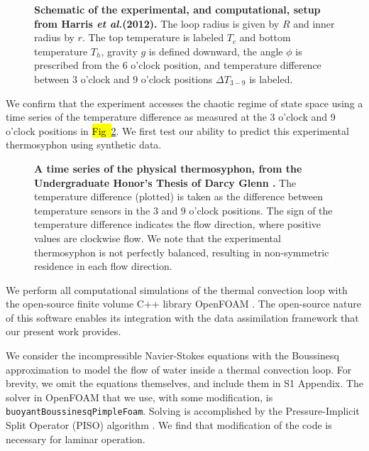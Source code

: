 \documentclass[10pt,letterpaper]{article}
\newcommand{\etal}{\textit{et al.}}
\begin{document}
\begin{figure}[h]
  \centering
  \caption[Schematic of the experimental, and computational, setup from Harris \etal (2012)]{
\textbf{    Schematic of the experimental, and computational, setup from Harris \etal (2012).
}    The loop radius is given by $R$ and inner radius by $r$.
    The top temperature is labeled $T_c$ and bottom temperature $T_h$, gravity $g$ is defined downward, the angle $\phi$ is prescribed from the 6 o'clock position, and temperature difference between 3 o'clock and 9 o'clock positions $\Delta T_{3-9}$ is labeled.
  }
  \label{fig:thermosyphon-schematic}
\end{figure}

We confirm that the experiment accesses the chaotic regime of state space using a time series of the temperature difference as measured at the 3 o'clock and 9 o'clock positions in \hl{Fig~}\ref{fig:thermosyphon-physical-timeseries}.
We first test our ability to predict this experimental thermosyphon using synthetic data.

\begin{figure}[h]
  \centering
  \caption[A time series of the physical thermosyphon, from the Undergraduate Honor's Thesis of Darcy Glenn {\protect \cite{glenn2013}}]{
\textbf{    A time series of the physical thermosyphon, from the Undergraduate Honor's Thesis of Darcy Glenn {\protect \cite{glenn2013}}.
}    The temperature difference (plotted) is taken as the difference between temperature sensors in the 3 and 9 o'clock positions.
     The sign of the temperature difference indicates the flow direction, where positive values are clockwise flow.
     We note that the experimental thermosyphon is not perfectly balanced, resulting in non-symmetric residence in each flow direction.
      }
  \label{fig:thermosyphon-physical-timeseries}
\end{figure}

We perform all computational simulations of the thermal convection loop with the open-source finite volume C++ library OpenFOAM \cite{jasak2007}.
The open-source nature of this software enables its integration with the data assimilation framework that our present work provides.

We consider the incompressible Navier-Stokes equations with the Boussinesq approximation to model the flow of water inside a thermal convection loop.
For brevity, we omit the equations themselves, and include them in S1 Appendix.
The solver in OpenFOAM that we use, with some modification, is \verb|buoyantBoussinesqPimpleFoam|.
Solving is accomplished by the Pressure-Implicit Split Operator (PISO) algorithm \cite{issa1986solution}.
We find that modification of the code is necessary for laminar operation.
\end{document}
